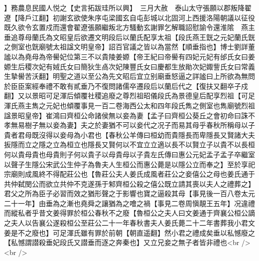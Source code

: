 】務農息民國人悦之【史言拓跋珪所以興】　三月大赦　泰山太守張願以郡叛降翟遼【降戶江翻】初謝玄欲使朱序屯梁國玄自屯彭城以北固河上西援洛陽朝議以征役既久欲令玄置戍而還會翟遼張願繼叛北方騷動玄謝罪乞解職詔慰諭令還淮隂　燕主垂追尊母蘭氏為文昭皇后欲遷文明段后以蘭氏配享太祖【段氏燕王皝之元妃蘭氏皝之側室也皝廟號太祖諡文明皇帝】詔百官議之皆以為當然【順垂指也】博士劉詳董謐以為堯母為帝嚳妃位第三不以貴陵姜嫄【帝王紀曰帝嚳有四妃元妃有邰氏女曰姜嫄生后稷次妃有娀氏女曰簡狄生卨次妃陳豐氏女曰慶都生放勛次妃娵訾氏女曰常義生摯嚳苦沃翻】明聖之道以至公為先文昭后宜立别廟垂怒逼之詳謐曰上所欲為無問於臣臣案經奉禮不敢有貳垂乃不復問諸儒卒遷段后以蘭后代之【復扶又翻卒子戍翻】又以景昭可足渾后傾覆社稷追廢之尊烈祖昭儀段氏為景德皇后配享烈祖【可足渾氏燕主雋之元妃也傾覆事見一百二卷海西公太和四年段氏雋之側室也雋廟號烈祖諡景昭皇帝】崔鴻曰齊桓公命諸侯無以妾為妻【孟子曰齊桓公葵丘之會初命曰誅不孝無易樹子無以妾為妻】夫之於妻猶不可以妾代之况子而易其母乎春秋所稱母以子貴者君母既沒得以妾母為小君也【春秋公羊傳曰桓幼而貴隱長而卑隱長又賢諸大夫扳隱而立之隱之立為桓立也隱長又賢何以不宜立立適以長不以賢立子以貴不以長桓何以貴母貴也母貴則子何以貴子以母貴母以子貴左氏傳曰惠公元妃孟子孟子卒繼室以聲子生隱公宋武公生仲子為魯夫人生桓公而惠公薨是以隱公立而奉之】至於享祀宗廟則成風終不得配莊公也【魯莊公夫人姜氏成風者莊公之妾僖公之母也姜氏通于共仲弑閔公而欲立共仲不克遂孫于邾齊桓公殺之僖公既立請其喪以夫人之禮葬之】君父之所為臣子必習而效之猶形聲之于影響也寶之逼殺其母【事見後一百八卷太元二十一年】由垂為之漸也堯舜之讓猶為之噲之禍【事見二卷周愼靚王五年】况違禮而縱私者乎昔文姜得罪於桓公春秋不之廢【魯桓公之夫人曰文姜通于齊襄公桓公謫之夫人以告襄公遂殺桓公至莊公二十一年春秋書夫人姜氏薨二十二年書葬我小君文姜是不之廢也】可足渾氏雖有罪於前朝【朝直遥翻】然小君之禮成矣垂以私憾廢之【私憾謂譛殺垂妃段氏又譛垂而逐之奔秦也】又立兄妾之無子者皆非禮也<br />
<br />
